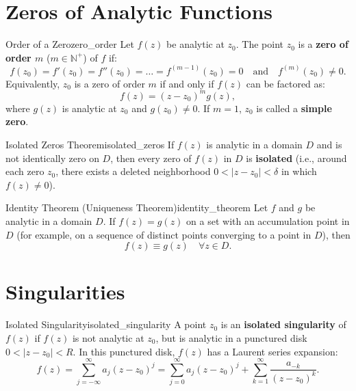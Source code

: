 \section{Zeros of Analytic Functions}

\begin{definition}{Order of a Zero}{zero_order}
Let $f(z)$ be analytic at $z_0$. The point $z_0$ is a \textbf{zero of order $m$} ($m \in \mathbb{N}^+$) of $f$ if:
\begin{equation}
f(z_0) = f'(z_0) = f''(z_0) = \dots = f^{(m-1)}(z_0) = 0 \quad \text{and} \quad f^{(m)}(z_0) \neq 0.
\end{equation}
Equivalently, $z_0$ is a zero of order $m$ if and only if $f(z)$ can be factored as:
\begin{equation}
f(z) = (z - z_0)^m g(z),
\end{equation}
where $g(z)$ is analytic at $z_0$ and $g(z_0) \neq 0$. If $m = 1$, $z_0$ is called a \textbf{simple zero}.
\end{definition}

\begin{theorem}{Isolated Zeros Theorem}{isolated_zeros}
If $f(z)$ is analytic in a domain $D$ and is not identically zero on $D$, then every zero of $f(z)$ in $D$ is \textbf{isolated} (i.e., around each zero $z_0$, there exists a deleted neighborhood $0 < |z - z_0| < \delta$ in which $f(z) \neq 0$).
\end{theorem}

\begin{theorem}{Identity Theorem (Uniqueness Theorem)}{identity_theorem}
Let $f$ and $g$ be analytic in a domain $D$. If $f(z) = g(z)$ on a set with an accumulation point in $D$ (for example, on a sequence of distinct points converging to a point in $D$), then
\begin{equation}
f(z) \equiv g(z) \quad \forall z \in D.
\end{equation}
\end{theorem}


\section{Singularities}

\begin{definition}{Isolated Singularity}{isolated_singularity}
A point $z_0$ is an \textbf{isolated singularity} of $f(z)$ if $f(z)$ is not analytic at $z_0$, but is analytic in a punctured disk $0 < |z - z_0| < R$.
In this punctured disk, $f(z)$ has a Laurent series expansion:
\begin{equation}
f(z) = \sum_{j=-\infty}^\infty a_j (z - z_0)^j = \sum_{j=0}^\infty a_j (z - z_0)^j + \sum_{k=1}^\infty \frac{a_{-k}}{(z - z_0)^k}.
\end{equation}
\end{definition}

